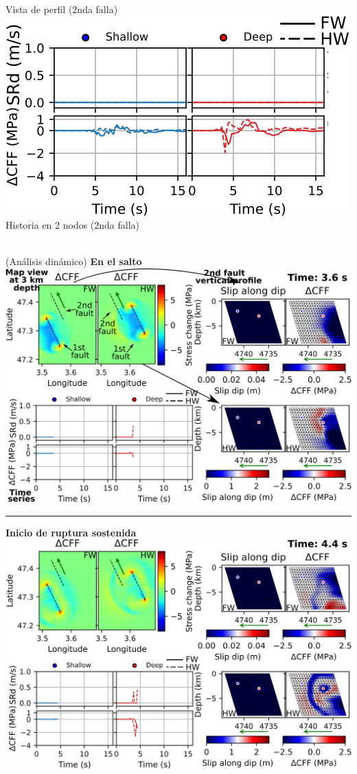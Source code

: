 \begin{poster}
{\begin{minipage}{0.32\linewidth}
Vista de perfil (2nda falla)
\vskip 0.2cm
\vskip 0.2cm
\includegraphics[width=0.87\linewidth]{images/horizontal_delta_00080_fix_3.png} \\
Historia en 2 nodos (2nda falla)
\end{minipage} \vrule width 0.06cm
\begin{minipage}{0.66\linewidth}
\vskip -0.0cm  \\ (An\'alisis din\'amico) \vskip 0.2cm
{\bf En el salto} \\ \vskip 0.2cm
 \includegraphics[width=0.8\linewidth]{images/horizontal_delta_00018_nofix.png}
\vskip 0.2cm
\hrule height 0.05cm
\vskip 0.2cm
{\bf Inicio de ruptura sostenida} \\ \vskip 0.2cm
\includegraphics[width=0.8\linewidth]{images/horizontal_delta_00022_nofix.png} \\

\end{minipage}}
\end{poster}
